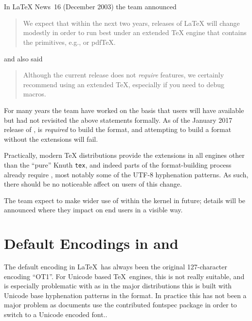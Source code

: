 \documentclass{ltnews}
\begin{document}
\maketitle

\section{\eTeX{}}

In \LaTeX{} News~16 (December 2003) the team announced
\begin{quotation}
We expect that within the next two years, releases of \LaTeX{} will
change modestly in order to run best under an extended \TeX{} engine
that contains the \eTeX{} primitives, e.g., \eTeX{} or pdf\TeX{}.
\end{quotation}
and also said
\begin{quotation}
Although the current release does not \emph{require} \eTeX{} features, we
certainly recommend using an extended \TeX{}, especially if you need to debug
macros.
\end{quotation}

For many years the team have worked on the basis that users will have \eTeX{}
available but had not revisited the above statements formally. As of the
January 2017 release of \LaTeXe{}, \eTeX{} is \emph{required} to build the
format, and attempting to build a format without the extensions will fail.

Practically, modern \TeX{} distributions provide the extensions in all engines
other than the ``pure'' Knuth \texttt{tex}, and indeed parts of the
format-building process already require \eTeX{}, most notably some of the UTF-8
hyphenation patterns. As such, there should be no noticeable affect on users of
this change.

The team expect to make wider use of \eTeX{} within the kernel in future;
details will be announced where they impact on end users in a visible way.

\section{Default Encodings in  and }
The default encoding in \LaTeX\ has always been the original
127-character encoding ``OT1''.  For Unicode based \TeX\ engines, this
is not really suitable, and is especially problematic with
 as in the major distributions this is built with
Unicode base hyphenation patterns in the format.  In practice this has
not been a major problem as documents use the contributed
\textsf{fontspec} package in order to switch to a
Unicode encoded font..
\end{document}
